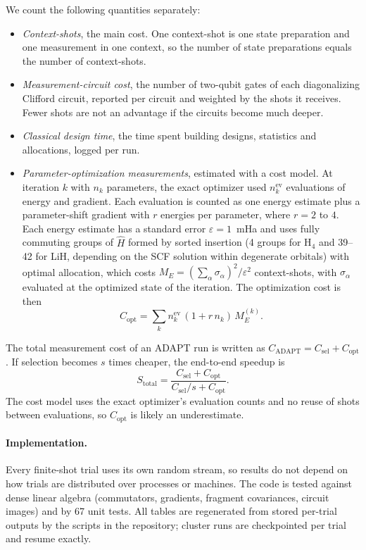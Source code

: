 \documentclass[aps,pra,reprint,superscriptaddress,nofootinbib]{revtex4-2}
\begin{document}
We count the following quantities separately:
\begin{itemize}
\item \emph{Context-shots}, the main cost. One context-shot is one state preparation and one measurement in one context, so the number of state preparations equals the number of context-shots.
\item \emph{Measurement-circuit cost}, the number of two-qubit gates of each diagonalizing Clifford circuit, reported per circuit and weighted by the shots it receives. Fewer shots are not an advantage if the circuits become much deeper.
\item \emph{Classical design time}, the time spent building designs, statistics and allocations, logged per run.
\item \emph{Parameter-optimization measurements}, estimated with a cost model. At iteration $k$ with $n_k$ parameters, the exact optimizer used $n_k^{\mathrm{ev}}$ evaluations of energy and gradient. Each evaluation is counted as one energy estimate plus a parameter-shift gradient with $r$ energies per parameter, where $r=2$ to $4$. Each energy estimate has a standard error $\varepsilon=1$~mHa and uses fully commuting groups of $\hat H$ formed by sorted insertion (4 groups for H$_4$ and 39--42 for LiH, depending on the SCF solution within degenerate orbitals) with optimal allocation, which costs $M_E=(\sum_\alpha\sigma_\alpha)^2/\varepsilon^2$ context-shots, with $\sigma_\alpha$ evaluated at the optimized state of the iteration. The optimization cost is then
\begin{equation}
C_{\mathrm{opt}}=\sum_k n^{\mathrm{ev}}_k\,(1+r\,n_k)\,M_E^{(k)} .
\end{equation}
\end{itemize}
The total measurement cost of an ADAPT run is written as $C_{\mathrm{ADAPT}}=C_{\mathrm{sel}}+C_{\mathrm{opt}}$. If selection becomes $s$ times cheaper, the end-to-end speedup is
\begin{equation}
S_{\mathrm{total}}=\frac{C_{\mathrm{sel}}+C_{\mathrm{opt}}}{C_{\mathrm{sel}}/s+C_{\mathrm{opt}}} .
\label{eq:stotal}
\end{equation}
The cost model uses the exact optimizer's evaluation counts and no reuse of shots between evaluations, so $C_{\mathrm{opt}}$ is likely an underestimate.

\paragraph{Implementation.} Every finite-shot trial uses its own random stream, so results do not depend on how trials are distributed over processes or machines. The code is tested against dense linear algebra (commutators, gradients, fragment covariances, circuit images) and by 67 unit tests. All tables are regenerated from stored per-trial outputs by the scripts in the repository; cluster runs are checkpointed per trial and resume exactly.
\end{document}
